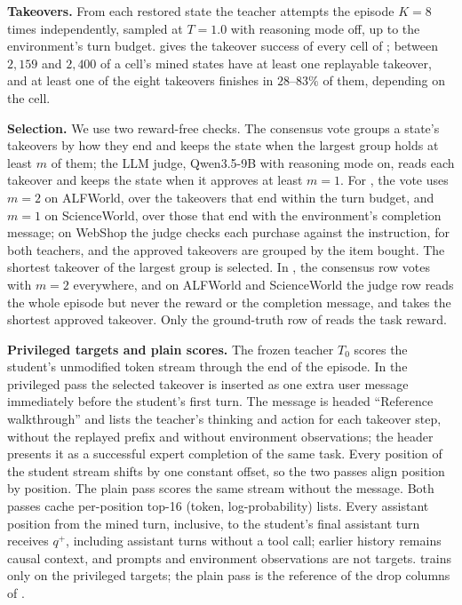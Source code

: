 \textbf{Takeovers.} From each restored state the teacher attempts the episode $K{=}8$ times independently, sampled at $T{=}1.0$ with reasoning mode off, up to the environment's turn budget.  gives the takeover success of every cell of ; between $2{,}159$ and $2{,}400$ of a cell's mined states have at least one replayable takeover, and at least one of the eight takeovers finishes in $28$--$83\%$ of them, depending on the cell.

\textbf{Selection.} We use two reward-free checks. The consensus vote groups a state's takeovers by how they end and keeps the state when the largest group holds at least $m$ of them; the LLM judge, Qwen3.5-9B with reasoning mode on, reads each takeover and keeps the state when it approves at least $m{=}1$. For , the vote uses $m{=}2$ on ALFWorld, over the takeovers that end within the turn budget, and $m{=}1$ on ScienceWorld, over those that end with the environment's completion message; on WebShop the judge checks each purchase against the instruction, for both teachers, and the approved takeovers are grouped by the item bought. The shortest takeover of the largest group is selected. In , the consensus row votes with $m{=}2$ everywhere, and on ALFWorld and ScienceWorld the judge row reads the whole episode but never the reward or the completion message, and takes the shortest approved takeover. Only the ground-truth row of  reads the task reward.

\textbf{Privileged targets and plain scores.} The frozen teacher $T_0$ scores the student's unmodified token stream through the end of the episode. In the privileged pass the selected takeover is inserted as one extra user message immediately before the student's first turn. The message is headed ``Reference walkthrough'' and lists the teacher's thinking and action for each takeover step, without the replayed prefix and without environment observations; the header presents it as a successful expert completion of the same task. Every position of the student stream shifts by one constant offset, so the two passes align position by position. The plain pass scores the same stream without the message. Both passes cache per-position top-16 (token, log-probability) lists. Every assistant position from the mined turn, inclusive, to the student's final assistant turn receives $q^+$, including assistant turns without a tool call; earlier history remains causal context, and prompts and environment observations are not targets. \method{} trains only on the privileged targets; the plain pass is the reference of the drop columns of .

